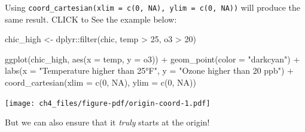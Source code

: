 \documentclass[
  letterpaper,
]{scrbook}
\newenvironment{Shaded}{\begin{snugshade}}{\end{snugshade}}
\newcommand{\AttributeTok}[1]{\textcolor[rgb]{0.40,0.45,0.13}{#1}}
\newcommand{\ConstantTok}[1]{\textcolor[rgb]{0.56,0.35,0.01}{#1}}
\newcommand{\DecValTok}[1]{\textcolor[rgb]{0.68,0.00,0.00}{#1}}
\newcommand{\FunctionTok}[1]{\textcolor[rgb]{0.28,0.35,0.67}{#1}}
\newcommand{\NormalTok}[1]{\textcolor[rgb]{0.00,0.23,0.31}{#1}}
\newcommand{\OtherTok}[1]{\textcolor[rgb]{0.00,0.23,0.31}{#1}}
\newcommand{\SpecialCharTok}[1]{\textcolor[rgb]{0.37,0.37,0.37}{#1}}
\newcommand{\StringTok}[1]{\textcolor[rgb]{0.13,0.47,0.30}{#1}}
\begin{document}
\begin{tcolorbox}[enhanced jigsaw, rightrule=.15mm, arc=.35mm, title=\textcolor{quarto-callout-tip-color}{\faLightbulb}\hspace{0.5em}{Another Way using
\texttt{coord\_cartesian(xlim\ =\ c(0,\ NA),\ ylim\ =\ c(0,\ NA))}}, colback=white, toptitle=1mm, colbacktitle=quarto-callout-tip-color!10!white, breakable, left=2mm, opacityback=0, leftrule=.75mm, bottomrule=.15mm, bottomtitle=1mm, colframe=quarto-callout-tip-color-frame, coltitle=black, toprule=.15mm, opacitybacktitle=0.6, titlerule=0mm]

Using \texttt{coord\_cartesian(xlim\ =\ c(0,\ NA),\ ylim\ =\ c(0,\ NA))}
will produce the same result. CLICK to See the example below:

\begin{Shaded}
\begin{Highlighting}[]
\NormalTok{chic\_high }\OtherTok{\textless{}{-}}\NormalTok{ dplyr}\SpecialCharTok{::}\FunctionTok{filter}\NormalTok{(chic, temp }\SpecialCharTok{\textgreater{}} \DecValTok{25}\NormalTok{, o3 }\SpecialCharTok{\textgreater{}} \DecValTok{20}\NormalTok{)}

\FunctionTok{ggplot}\NormalTok{(chic\_high, }\FunctionTok{aes}\NormalTok{(}\AttributeTok{x =}\NormalTok{ temp, }\AttributeTok{y =}\NormalTok{ o3)) }\SpecialCharTok{+}
  \FunctionTok{geom\_point}\NormalTok{(}\AttributeTok{color =} \StringTok{"darkcyan"}\NormalTok{) }\SpecialCharTok{+}
  \FunctionTok{labs}\NormalTok{(}\AttributeTok{x =} \StringTok{"Temperature higher than 25°F"}\NormalTok{,}
       \AttributeTok{y =} \StringTok{"Ozone higher than 20 ppb"}\NormalTok{) }\SpecialCharTok{+}
  \FunctionTok{coord\_cartesian}\NormalTok{(}\AttributeTok{xlim =} \FunctionTok{c}\NormalTok{(}\DecValTok{0}\NormalTok{, }\ConstantTok{NA}\NormalTok{), }\AttributeTok{ylim =} \FunctionTok{c}\NormalTok{(}\DecValTok{0}\NormalTok{, }\ConstantTok{NA}\NormalTok{))}
\end{Highlighting}
\end{Shaded}

\texttt{[image: ch4\_files/figure-pdf/origin-coord-1.pdf]}

\end{tcolorbox}

But we can also ensure that it \emph{truly} starts at the origin!
\end{document}
